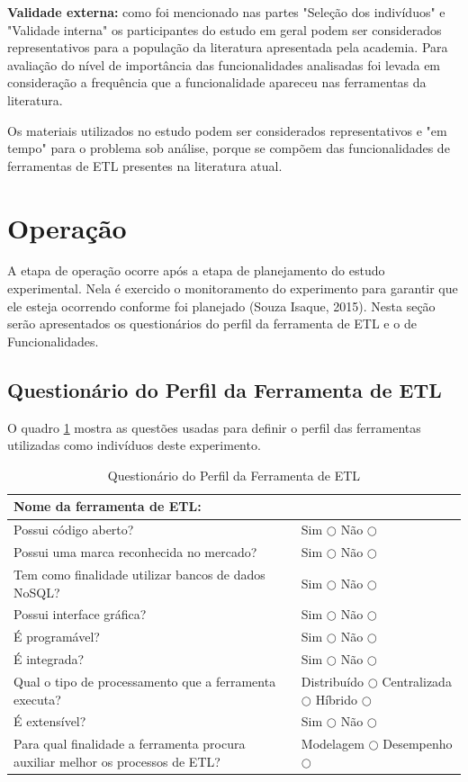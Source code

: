 \textbf{Validade externa:} como foi mencionado nas partes "Seleção dos indivíduos" e "Validade interna" os participantes do estudo em geral podem ser considerados representativos para a população da literatura apresentada pela academia. Para avaliação do nível de importância das funcionalidades analisadas foi levada em consideração a frequência que a funcionalidade apareceu nas ferramentas da literatura.

Os materiais utilizados no estudo podem ser considerados representativos e "em tempo" para o problema sob análise, porque se compõem das funcionalidades de ferramentas de ETL presentes na literatura atual.

\section{Operação}

A etapa de operação ocorre após a etapa de planejamento do estudo experimental. Nela é exercido o monitoramento do experimento para garantir que ele esteja ocorrendo conforme foi planejado (Souza Isaque, 2015). Nesta seção serão apresentados os questionários do perfil da ferramenta de ETL e o de Funcionalidades.

\subsection{Questionário do Perfil da Ferramenta de ETL}

O quadro \ref{questionarioperfil} mostra as questões usadas para definir o perfil das ferramentas utilizadas como indivíduos deste experimento.

\begin{table}[ht]
	\centering
	\caption{Questionário do Perfil da Ferramenta de ETL}
	\label{questionarioperfil}
	\begin{tabular}{|p{8cm}| p{8cm}| }
		\hline
		Nome da ferramenta de ETL: & \\
		\hline
		Possui código aberto? & Sim $\bigcirc$ Não $\bigcirc$ \\
		\hline
		Possui uma marca reconhecida no mercado? & Sim $\bigcirc$ Não $\bigcirc$ \\
		\hline
		Tem como finalidade utilizar bancos de dados NoSQL? &  Sim $\bigcirc$ Não $\bigcirc$ \\
		\hline
		Possui interface gráfica? & Sim $\bigcirc$ Não $\bigcirc$ \\
		\hline
		É programável?  & Sim $\bigcirc$ Não $\bigcirc$ \\
		\hline
		É integrada? & Sim $\bigcirc$ Não $\bigcirc$ \\
		\hline
		Qual o tipo de processamento que a ferramenta executa? & Distribuído  $\bigcirc$  Centralizada  $\bigcirc$  Híbrido  $\bigcirc$ \\
		\hline
		É extensível? & Sim $\bigcirc$ Não $\bigcirc$ \\
		\hline
		Para qual finalidade a ferramenta procura auxiliar melhor os processos de ETL? & Modelagem $\bigcirc$ Desempenho $\bigcirc$ \\
		\hline
		
		
	\end{tabular}
\end{table}


